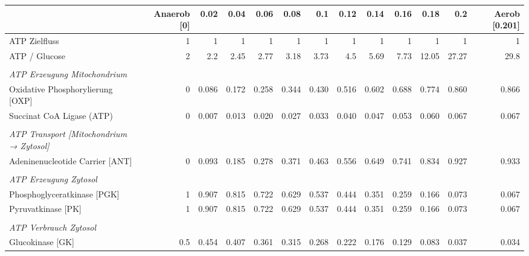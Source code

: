 \begin{landscape}
\begin{table}[htp]
\centering
\tiny
\begin{tabular}{l rrr rrr rrr rrr}
\toprule
 & \textbf{Anaerob [0]}& \textbf{0.02} &\textbf{0.04} & \textbf{0.06} & \textbf{0.08} & \textbf{0.1} & \textbf{0.12} & \textbf{0.14}
 & \textbf{0.16} & \textbf{0.18} & \textbf{0.2} & \textbf{Aerob [0.201]}\\
\midrule
ATP Zielfluss & 1 & 1 & 1 & 1 & 1 & 1 & 1 & 1 & 1 & 1 & 1 & 1\\
ATP / Glucose & 2 & 2.2 & 2.45 & 2.77 & 3.18 & 3.73 & 4.5 & 5.69 & 7.73 & 12.05 & 27.27 & 29.8\\
 &  &  &  &  &  &  &  &  &  &  &  & \\
\textit{ATP Erzeugung Mitochondrium} &  &  &  &  &  &  &  &  &  &  &  & \\
\hspace*{5mm}Oxidative Phosphorylierung [OXP] & 0 & 0.086 & 0.172 & 0.258 & 0.344 & 0.430 & 0.516 & 0.602 & 0.688 & 0.774 & 0.860 & 0.866\\
\hspace*{5mm}Succinat CoA Ligase (ATP) & 0 & 0.007 & 0.013 & 0.020 & 0.027 & 0.033 & 0.040 & 0.047 & 0.053 & 0.060 & 0.067 & 0.067\\
 &  &  &  &  &  &  &  &  &  &  &  & \\
\textit{ATP Transport [Mitochondrium → Zytosol]} &  &  &  &  &  &  &  &  &  &  &  & \\
\hspace*{5mm}Adeninenucleotide Carrier [ANT] & 0 & 0.093 & 0.185 & 0.278 & 0.371 & 0.463 & 0.556 & 0.649 & 0.741 & 0.834 & 0.927 & 0.933\\
 &  &  &  &  &  &  &  &  &  &  &  & \\
\textit{ATP Erzeugung Zytosol} &  &  &  &  &  &  &  &  &  &  &  & \\
\hspace*{5mm}Phosphoglyceratkinase [PGK] &1 & 0.907 & 0.815 & 0.722 & 0.629 & 0.537 & 0.444 & 0.351 & 0.259 & 0.166 & 0.073 & 0.067\\
\hspace*{5mm}Pyruvatkinase [PK] & 1 & 0.907 & 0.815 & 0.722 & 0.629 & 0.537 & 0.444 & 0.351 & 0.259 & 0.166 & 0.073 & 0.067\\
 &  &  &  &  &  &  &  &  &  &  &  & \\
\textit{ATP Verbrauch Zytosol} &  &  &  &  &  &  &  &  &  &  &  & \\
\hspace*{5mm}Glucokinase [GK] & 0.5 & 0.454 & 0.407 & 0.361 & 0.315 & 0.268 & 0.222 & 0.176 & 0.129 & 0.083 & 0.037 & 0.034\\

\end{tabular}
\end{table}
\end{landscape}
